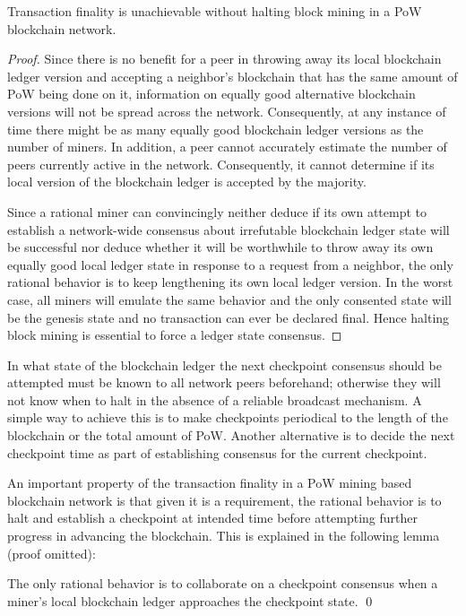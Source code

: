 \begin{lemma}
\label{l-halt}
Transaction finality is unachievable without halting block mining in a PoW blockchain network.  
\end{lemma}

\begin{proof}
Since there is no benefit for a peer in throwing away its local blockchain ledger version and accepting a neighbor's blockchain that has the same amount of PoW being done on it, information on equally good alternative blockchain versions will not be spread across the network. Consequently, at any instance of time there might be as many equally good blockchain ledger versions as the number of miners. In addition, a peer cannot accurately estimate the number of peers currently active in the network. Consequently, it cannot determine if its local version of the blockchain ledger is accepted by the majority. 

Since a rational miner can convincingly neither deduce if its own attempt to establish a network-wide consensus about irrefutable blockchain ledger state will be successful nor deduce whether it will be worthwhile to throw away its own equally good local ledger state in response to a request from a neighbor, the only rational behavior is to keep lengthening its own local ledger version. In the worst case, all miners will emulate the same behavior and the only consented state will be the genesis state and no transaction can ever be declared final. Hence halting block mining is essential to force a ledger state consensus.             
\end{proof}                

In what state of the blockchain ledger the next checkpoint consensus should be attempted must be known to all network peers beforehand; otherwise they will not know when to halt in the absence of a reliable broadcast mechanism. A simple way to achieve this is to make checkpoints periodical to the length of the blockchain or the total amount of PoW. Another alternative is to decide the next checkpoint time as part of establishing consensus for the current checkpoint.    

An important property of the transaction finality in a PoW mining based blockchain network is that given it is a requirement, the rational behavior is to halt and establish a checkpoint at intended time before attempting further progress in advancing the blockchain. This is explained in the following lemma (proof omitted):

\begin{lemma}
\label{l-rationality}
The only rational behavior is to collaborate on a checkpoint consensus when a miner's local blockchain ledger approaches the checkpoint state. \qed       
\end{lemma}

